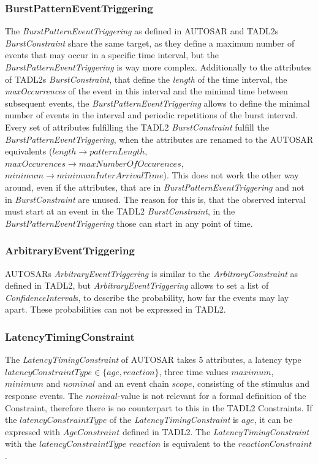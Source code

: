 	\subsubsection{BurstPatternEventTriggering}
		The \emph{BurstPatternEventTriggering} as defined in AUTOSAR and TADL2s \emph{BurstConstraint} share the same target, as they define a maximum number of events that may occur in a specific time interval, but the \emph{BurstPatternEventTriggering} is way more complex. Additionally to the attributes of TADL2s \emph{BurstConstraint}, that define the \emph{length} of the time interval, the \emph{maxOccurrences} of the event in this interval and the minimal time between subsequent events, the \emph{BurstPatternEventTriggering} allows to define the minimal number of events in the interval and periodic repetitions of the burst interval.\\
		Every set of attributes fulfilling the TADL2 \emph{BurstConstraint} fulfill the \emph{BurstPatternEventTriggering}, when the attributes are renamed to the AUTOSAR equivalents ($length\rightarrow patternLength$, $maxOccurences\rightarrow maxNumberOfOccurences$, $minimum\rightarrow minimumInterArrivalTime$). This does not work the other way around, even if the attributes, that are in \emph{BurstPatternEventTriggering} and not in \emph{BurstConstraint} are unused. The reason for this is, that the observed interval must start at an event in the TADL2 \emph{BurstConstraint}, in the \emph{BurstPatternEventTriggering} those can start in any point of time.
		
	\subsubsection{ArbitraryEventTriggering}
		AUTOSARs \emph{ArbitraryEventTriggering} is similar to the \emph{ArbitraryConstraint} as defined in TADL2, but \emph{ArbitraryEventTriggering} allows to set a list of \emph{ConfidenceInterval}s, to describe the probability, how far the events may lay apart. These probabilities can not be expressed in TADL2.
		
	\subsubsection{LatencyTimingConstraint}
		The \emph{LatencyTimingConstraint} of AUTOSAR takes 5 attributes, a latency type $latencyConstraintType\in \{age, reaction\}$, three time values $maximum$, $minimum$ and $nominal$ and an event chain $scope$, consisting of the stimulus and response events. The $nominal$-value is not relevant for a formal definition of the Constraint, therefore there is no counterpart to this in the TADL2 Constraints. If the $latencyConstraintType$ of the \emph{LatencyTimingConstraint} is $age$, it can be expressed with $AgeConstraint$ defined in TADL2. The \emph{LatencyTimingConstraint} with the $latencyConstraintType$ $reaction$ is equivalent to the $reactionConstraint$.
	
